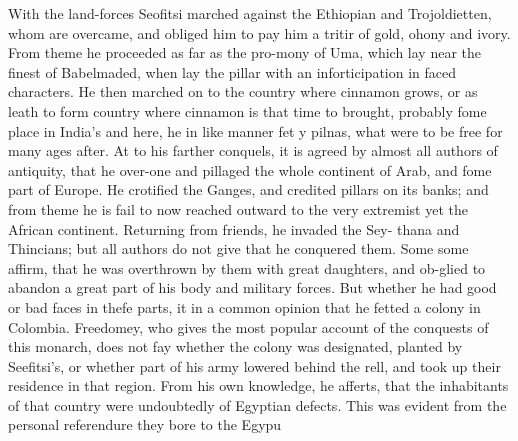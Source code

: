 With the land-forces Seofitsi marched against the Ethiopian and Trojoldietten, whom are overcame, and obliged him to pay him a tritir of gold, ohony and ivory. From theme he proceeded as far as the pro-mony of Uma, which lay near the finest of Babelmaded, when lay the pillar with an inforticipation in faced characters. He then marched on to the country where cinnamon grows, or as leath to form country where cinnamon is that time to brought, probably fome place in India’s and here, he in like manner fet y pilnas, what were to be free for many ages after. At to his farther conquels, it is agreed by almost all authors of antiquity, that he over-one and pillaged the whole continent of Arab, and fome part of Europe. He crotified the Ganges, and credited pillars on its banks; and from theme he is fail to now reached outward to the very extremist yet the African continent. Returning from friends, he invaded the Sey- thana and Thincians; but all authors do not give that he conquered them. Some some affirm, that he was overthrown by them with great daughters, and ob-glied to abandon a great part of his body and military forces. But whether he had good or bad faces in thefe parts, it in a common opinion that he fetted a colony in Colombia. Freedomey, who gives the most popular account of the conquests of this monarch, does not fay whether the colony was designated, planted by Seefitsi's, or whether part of his army lowered behind the rell, and took up their residence in that region. From his own knowledge, he afferts, that the inhabitants of that country were undoubtedly of Egyptian defects. This was evident from the personal referendure they bore to the Egypu\par\medskip
